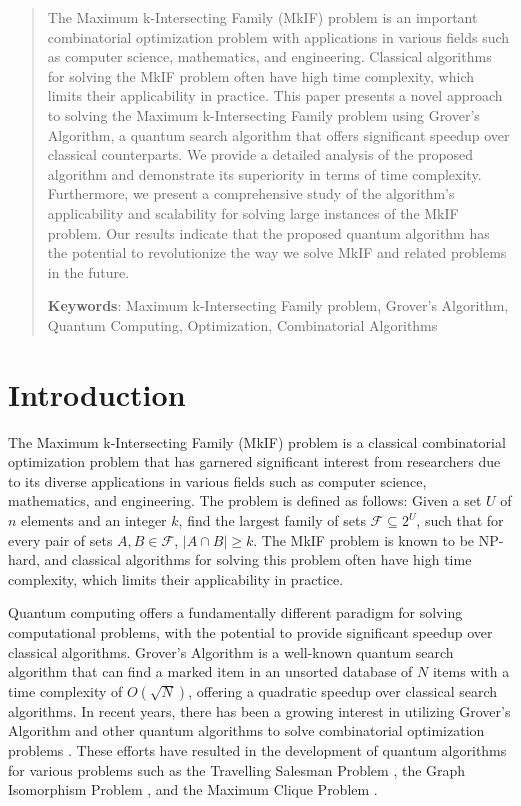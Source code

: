 \begin{abstract}
The Maximum k-Intersecting Family (MkIF) problem is an important combinatorial optimization problem with applications in various fields such as computer science, mathematics, and engineering. Classical algorithms for solving the MkIF problem often have high time complexity, which limits their applicability in practice. This paper presents a novel approach to solving the Maximum k-Intersecting Family problem using Grover's Algorithm, a quantum search algorithm that offers significant speedup over classical counterparts. We provide a detailed analysis of the proposed algorithm and demonstrate its superiority in terms of time complexity. Furthermore, we present a comprehensive study of the algorithm's applicability and scalability for solving large instances of the MkIF problem. Our results indicate that the proposed quantum algorithm has the potential to revolutionize the way we solve MkIF and related problems in the future.

\textbf{Keywords}: Maximum k-Intersecting Family problem, Grover's Algorithm, Quantum Computing, Optimization, Combinatorial Algorithms
\end{abstract}

\section{Introduction}
\label{sec:introduction}

The Maximum k-Intersecting Family (MkIF) problem is a classical combinatorial optimization problem that has garnered significant interest from researchers due to its diverse applications in various fields such as computer science, mathematics, and engineering. The problem is defined as follows: Given a set $U$ of $n$ elements and an integer $k$, find the largest family of sets $\mathcal{F} \subseteq 2^U$, such that for every pair of sets $A, B \in \mathcal{F}$, $|A \cap B| \geq k$. The MkIF problem is known to be NP-hard, and classical algorithms for solving this problem often have high time complexity, which limits their applicability in practice.

Quantum computing offers a fundamentally different paradigm for solving computational problems, with the potential to provide significant speedup over classical algorithms. Grover's Algorithm \cite{grover1996fast} is a well-known quantum search algorithm that can find a marked item in an unsorted database of $N$ items with a time complexity of $O(\sqrt{N})$, offering a quadratic speedup over classical search algorithms. In recent years, there has been a growing interest in utilizing Grover's Algorithm and other quantum algorithms to solve combinatorial optimization problems \cite{nielsen2011quantum,ambainis2018quantum}. These efforts have resulted in the development of quantum algorithms for various problems such as the Travelling Salesman Problem \cite{zalka1999grover}, the Graph Isomorphism Problem \cite{childs2017quantum}, and the Maximum Clique Problem \cite{gupta2018quantum}.

